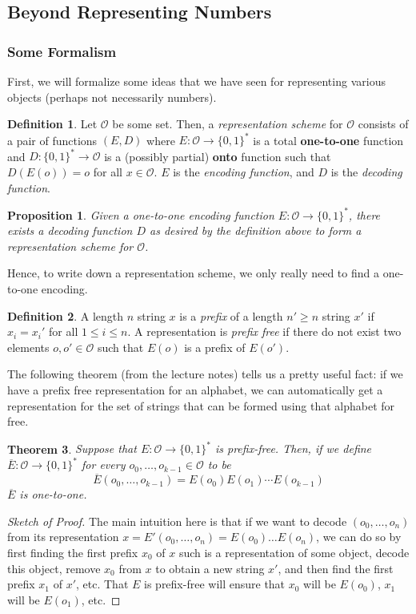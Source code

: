 \documentclass[11pt]{article}
\newtheorem{theorem}{Theorem}
\newtheorem*{proposition}{Proposition}
\theoremstyle{definition}
\newtheorem{defn}[theorem]{Definition}
\theoremstyle{remark}
\newcommand{\nc}{\newcommand}
\begin{document}
\subsection{Beyond Representing Numbers}
\subsubsection{Some Formalism}
First, we will formalize some ideas that we have seen for representing various objects (perhaps not necessarily numbers).
\nc{\oo}{\mathcal{O}}
\begin{defn}
Let $\oo$ be some set. Then, a \emph{representation scheme} for $\oo$ consists of a pair of functions $(E, D)$ where $E : \oo \to \{0,1\}^*$ is a total \textbf{one-to-one} function and $D: \{0,1\}^* \to \oo$ is a (possibly partial) \textbf{onto} function such that $D(E(o)) = o$ for all $x \in \oo$. $E$ is the \emph{encoding function}, and $D$ is the \emph{decoding function}.
\end{defn}
\begin{proposition}
Given a one-to-one encoding function $E : \oo \to \{0,1\}^*$, there exists a decoding function $D$ as desired by the definition above to form a representation scheme for $\oo$.
\end{proposition}
Hence, to write down a representation scheme, we only really need to find a one-to-one encoding.
\begin{defn}
A length $n$ string $x$ is a \emph{prefix} of a length $n' \geq n$ string $x'$ if $x_i = x_i'$ for all $1 \leq i \leq n$. A representation is \emph{prefix free} if there do not exist two elements $o, o' \in \oo$ such that $E(o)$ is a prefix of $E(o')$.
\end{defn}
The following theorem (from the lecture notes) tells us a pretty useful fact: if we have a prefix free representation for an alphabet, we can automatically get a representation for the set of strings that can be formed using that alphabet for free.
\begin{theorem}
Suppose that $E:\mathcal{O} \rightarrow \{0,1\}^*$ is prefix-free. Then, if we define $\overline{E}:\mathcal{O} \rightarrow \{0,1\}^*$ for every $o_0,\ldots,o_{k-1} \in \mathcal{O}$ to be $$ \overline{E}(o_0,\ldots,o_{k-1}) = E(o_0)E(o_1) \cdots E(o_{k-1}) $$
$\overline{E}$ is one-to-one.
\end{theorem}
\begin{proof}[Sketch of Proof]
The main intuition here is that if we want to decode  $(o_0,\ldots,o_n)$ from its representation $x= E'(o_0,\ldots,o_n)=E(o_0)\ldots E(o_n)$, we can do so by first finding the first prefix $x_0$ of $x$ such is a representation of some object, decode this object, remove $x_0$ from $x$ to obtain a new string $x'$, and then find the first prefix $x_1$ of $x'$, etc. That $E$ is prefix-free will ensure that $x_0$ will be $E(o_0)$, $x_1$ will be $E(o_1)$, etc.
\end{proof}
\end{document}
